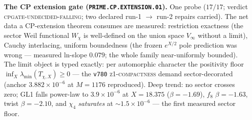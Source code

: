 \documentclass[11pt,a4paper]{article}
\theoremstyle{definition}
\begin{document}
\par\smallskip\noindent\textbf{The CP extension gate
(\texttt{PRIME.CP.EXTENSION.01}).}
One probe ($17/17$; verdict \textsc{cpgate-undecided-falling}; two
declared run-1 $\to$ run-2 repairs carried).  The net data a
CP-extension theorem consumes are measured: restriction exactness
(the sector Weil functional $W_{\chi}$ is well-defined on the union
space $V_{\infty}$ without a limit), Cauchy interlacing, uniform
boundedness (the frozen $e^{X/2}$ pole prediction was wrong ---
measured ln-slope $0.079$; the whole family near-uniformly bounded).
The limit object is typed exactly: per automorphic character the
positivity floor $\inf_X\lambda_{\min}(T_{\chi,X})\ge0$ --- the
\texttt{v780} \textsc{z1-compactness} demand sector-decorated
(anchor $3.882\times10^{-6}$ at $M=1176$ reproduced).  Deep trend:
no sector crosses zero; GL1 falls power-law to $3.9\times10^{-6}$ at
$X=18.375$ ($\beta=-1.69$), $f_8$ $\beta=-1.63$, twist
$\beta=-2.10$, and $\chi_4$ \emph{saturates} at
${\sim}1.5\times10^{-6}$ --- the first measured sector floor.
\end{document}
